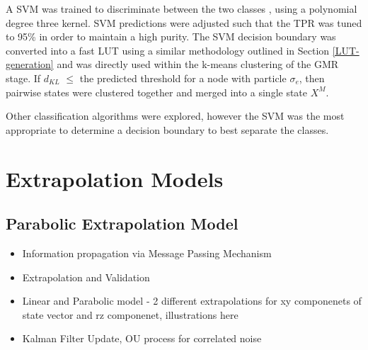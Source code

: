 
A SVM was trained to discriminate between the two classes \cite{scikit-learn}, using a polynomial degree three kernel. SVM predictions were adjusted such that the TPR was tuned to 95\% in order to maintain a high purity. The SVM decision boundary was converted into a fast LUT using a similar methodology outlined in Section \ref{LUT-generation} and was directly used within the k-means clustering of the GMR stage. If $d_{KL}$ $\leq$ the predicted threshold for a node with particle $\sigma_e$, then pairwise states were clustered together and merged into a single state $X^M$.


Other classification algorithms were explored, however the SVM was the most appropriate to determine a decision boundary to best separate the classes.






\section{Extrapolation Models}
\label{chapter-6-extrapolation}

\subsection{Parabolic Extrapolation Model}
\begin{itemize}
    \item Information propagation via Message Passing Mechanism
    \item Extrapolation and Validation
    \item Linear and Parabolic model - 2 different extrapolations for xy componenets of state vector and rz componenet, illustrations here
    \item Kalman Filter Update, OU process for correlated noise
\end{itemize}

